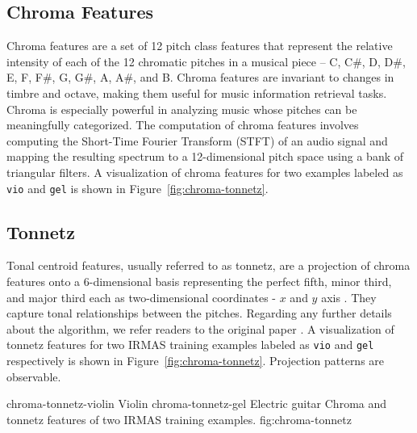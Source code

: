\subsection{Chroma Features}
\label{sec:chroma-features}
Chroma features are a set of 12 pitch class features that represent the relative intensity of each of the 12 chromatic pitches in a musical piece -- C, C\#, D, D\#, E, F, F\#, G, G\#, A, A\#, and B. Chroma features are invariant to changes in timbre and octave, making them useful for music information retrieval tasks. Chroma is especially powerful in analyzing music whose pitches can be meaningfully categorized. The computation of chroma features involves computing the Short-Time Fourier Transform (STFT) of an audio signal and mapping the resulting spectrum to a 12-dimensional pitch space using a bank of triangular filters. A visualization of chroma features for two examples labeled as \texttt{vio} and \texttt{gel} is shown in Figure~\ref{fig:chroma-tonnetz}.

\subsection{Tonnetz}
\label{sec:tonnetz}
Tonal centroid features, usually referred to as tonnetz, are a projection of chroma features onto a 6-dimensional basis representing the perfect fifth, minor third, and major third each as two-dimensional coordinates - $x$ and $y$ axis \cite{mcfee2015librosa}. They capture tonal relationships between the pitches. Regarding any further details about the algorithm, we refer readers to the original paper \cite{harte2006detecting}. A visualization of tonnetz features for two IRMAS training examples labeled as \texttt{vio} and \texttt{gel} respectively is shown in Figure~\ref{fig:chroma-tonnetz}. Projection patterns are observable. 

\asideimages{15cm}{15cm}
	    {chroma-tonnetz-violin}
	    {Violin}
	    {chroma-tonnetz-gel}
	    {Electric guitar}
	    {Chroma and tonnetz features of two IRMAS training examples.}
	    {fig:chroma-tonnetz}

